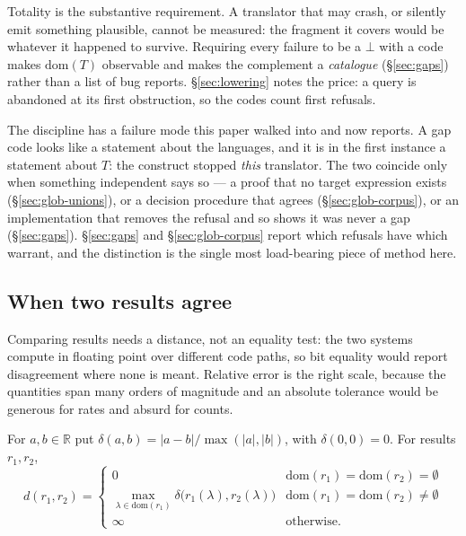 \noindent
Totality is the substantive requirement. A translator that may crash, or silently emit
something plausible, cannot be measured: the fragment it covers would be whatever it
happened to survive. Requiring every failure to be a $\bot$ with a code makes
$\mathrm{dom}(T)$ observable and makes the complement a \emph{catalogue}
(\S\ref{sec:gaps}) rather than a list of bug reports. \S\ref{sec:lowering} notes the
price: a query is abandoned at its first obstruction, so the codes count first refusals.

\begin{remark}\label{rem:refusal}
The discipline has a failure mode this paper walked into and now reports. A gap code
looks like a statement about the languages, and it is in the first instance a statement
about $T$: the construct stopped \emph{this} translator. The two coincide only when
something independent says so --- a proof that no target expression exists
(\S\ref{sec:glob-unions}), or a decision procedure that agrees
(\S\ref{sec:glob-corpus}), or an implementation that removes the refusal and so shows it
was never a gap (\S\ref{sec:gaps}). \S\ref{sec:gaps} and \S\ref{sec:glob-corpus} report
which refusals have which warrant, and the distinction is the single most load-bearing
piece of method here.
\end{remark}

\subsection{When two results agree}

Comparing results needs a distance, not an equality test: the two systems compute in
floating point over different code paths, so bit equality would report disagreement where
none is meant. Relative error is the right scale, because the quantities span many orders
of magnitude and an absolute tolerance would be generous for rates and absurd for counts.

\begin{definition}\label{def:d}
For $a,b\in\mathbb{R}$ put $\delta(a,b)=|a-b|/\max(|a|,|b|)$, with $\delta(0,0)=0$. For
results $r_1,r_2$,
\[
d(r_1,r_2)=\begin{cases}
0 & \mathrm{dom}(r_1)=\mathrm{dom}(r_2)=\emptyset\\
\max_{\lambda\in\mathrm{dom}(r_1)}\delta\big(r_1(\lambda),r_2(\lambda)\big)
  & \mathrm{dom}(r_1)=\mathrm{dom}(r_2)\neq\emptyset\\
\infty & \text{otherwise.}
\end{cases}
\]
\end{definition}


